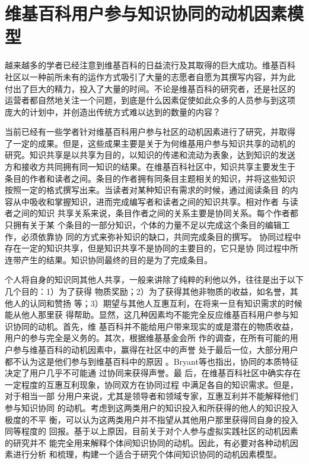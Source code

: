 
\chapter{维基百科用户参与知识协同的动机因素模型}
\label{cha:motivation}



越来越多的学者已经注意到维基百科的日益流行及其取得的巨大成功。维基百科
社区以一种前所未有的运作方式吸引了大量的志愿者自愿为其撰写内容，并为此
付出了巨大的精力，投入了大量的时间。不论是维基百科的研究者，还是社区的
运营者都自然地关注一个问题，到底是什么因素促使如此众多的人员参与到这项
庞大的计划中，并创造出传统方式难以达到的数量的内容？

当前已经有一些学者针对维基百科用户参与社区的动机因素进行了研究，并取得
了一定的成果。但是，这些成果主要是关于为何维基用户参与知识共享的动机的
研究。知识共享是以共享为目的，以知识的传递和流动为表象，达到知识的发送
方和接收方共同拥有同一知识的结果。在维基百科社区中，知识共享主要发生于
条目的作者和读者之间。条目的作者拥有同条目主题相关的知识，并将这些知识
按照一定的格式撰写出来。当读者对某种知识有需求的时候，通过阅读条目
的内容从中吸收和掌握知识，进而完成编写者和读者之间的知识共享。相对作者
与读者之间的知识
共享关系来说，条目作者之间的关系主要是协同关系。每个作者都只拥有关于某
个条目的一部分知识，个体的力量不足以完成这个条目的编辑工作，必须依靠协
同的方式来弥补知识的缺口，共同完成条目的撰写。
协同过程中存在一定的知识共享，但是知识共享不是协同的主要目的，它只是协
同过程中所连带产生的结果。知识协同最终的目的是为了完成条目。

个人将自身的知识同其他人共享，一般来讲除了纯粹的利他以外，往往是出于以下几个目的：1）为了获得
物质奖励；2）为了获得其他非物质的收益，如名誉，其他人的认同和赞扬
等；3）期望与其他人互惠互利，在将来一旦有知识需求的时候能从他人那里获
得帮助\cite{Zhugea}。显然，这几种因素均不能完全反应维基百科用户参与知识协同的动机。首先，维
基百科并不能给用户带来现实的或是潜在的物质收益，用户的参与完全是义务的。其次，根据维基基金会所
作的调查，在所有可能的用户参与维基百科的动机因素中，赢得在社区中的声誉
处于最后一位，大部分用户都不认为这是他们参与到维基百科中的原因
\cite{Glott2009}。Bryant等也指出，协同的本质特征决定了用户几乎不可能通
过协同来获得声誉\cite{1099205}。最
后，在维基百科社区中确实存在一定程度的互惠互利现象，协同双方在协同过程
中满足各自的知识需求。但是，对于相当一部
分用户来说，尤其是领导者和领域专家，互惠互利并不能解释他们参与知识协同
的动机。考虑到这两类用户的知识投入和所获得的他人的知识投入极度的不平
衡，可以认为这两类用户并不指望从其他用户那里获得同自身的投入同等程度的
回报。基于以上原因，目前关于对个人参与虚拟实践社区的动机因素的研究并不
能完全用来解释个体间知识协同的动机。因此，有必要对各种动机因素进行分析
和梳理，构建一个适合于研究个体间知识协同的动机因素模型。

